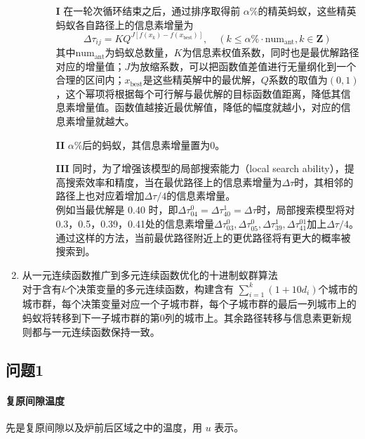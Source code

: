 \documentclass[../main.tex]{subfiles}
\begin{document}
\begin{enumerate}
\begin{enumerate}
\begin{itemize}
\item[\textbf{I}] 在一轮次循环结束之后，通过排序取得前 \(\alpha \%\)的精英蚂蚁，这些精英蚂蚁各自路径上的信息素增量为
\begin{equation}\label{equ:pass2}
\Delta \tau _{ij} = K Q ^{J [f (x_{k}) - f (x _{\mathrm{best}})]} , \quad (k \le \alpha \% \cdot \mathrm{num}_{\mathrm{ant}} , k \in \mathbf{Z})
\end{equation}
其中\(\mathrm{num}_{\mathrm{ant}}\)为蚂蚁总数量，\(K\)为信息素权值系数，同时也是最优解路径对应的增量值；\(J\)为放缩系数，可以把函数值差值进行无量纲化到一个合理的区间内；\(x_{\mathrm{best}}\)是这些精英解中的最优解，\(Q\)系数的取值为\((0,1)\)，这个幂项将根据每个可行解与最优解的目标函数值距离，降低其信息素增量值。函数值越接近最优解值，降低的幅度就越小，对应的信息素增量就越大。
\item[\textbf{II}] \(\alpha \%\)后的蚂蚁，其信息素增量置为0。
\item[\textbf{III}] 同时，为了增强该模型的局部搜索能力（local search ability），提高搜索效率和精度，当在最优路径上的信息素增量为\(\Delta \tau\)时，其相邻的路径上也对应着增加\(\Delta \tau / 4\)的信息素增量。\\
例如当最优解是 0.40 时，即\(\Delta \tau _{0 4} ^{0} = \Delta \tau ^{1} _{4 0} = \Delta \tau\)时，局部搜索模型将对0.3，0.5，0.39，0.41处的信息素增量\(\Delta \tau ^{0} _{03}, \Delta \tau_{05} ^{0} , \Delta \tau _{39} ^{1} , \Delta\tau _{41}^{01}\)加上\(\Delta \tau / 4\)。
通过这样的方法，当前最优路径附近上的更优路径将有更大的概率被搜索到。
\end{itemize}

\end{enumerate}
\item 从一元连续函数推广到多元连续函数优化的十进制蚁群算法\\
对于含有\(k\)个决策变量的多元连续函数，构建含有
\(\sum_{i = 1} ^{k} (1+ 10 d_{i})\)个城市的城市群，每个决策变量对应一个子城市群，每个子城市群的最后一列城市上的蚂蚁将转移到下一子城市群的第0列的城市上。其余路径转移与信息素更新规则都与一元连续函数保持一致。
\end{enumerate}
\subsection{问题1}

\paragraph{复原间隙温度} 先是复原间隙以及炉前后区域之中的温度，用 \(u\) 表示。
\end{document}
